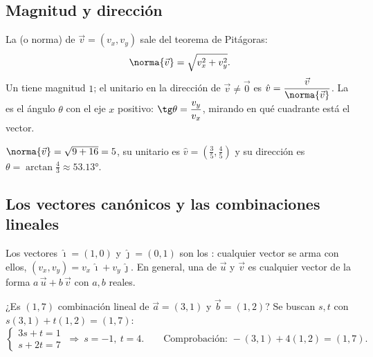 \documentclass[11pt,a4paper]{article}
\newcommand{\ii}{\hat{\imath}}
\newcommand{\jj}{\hat{\jmath}}
\newcommand{\plano}[4]{\draw[rejilla] (#1,#3) grid (#2,#4);
  \draw[ejes] (#1-0.3,0) -- (#2+0.4,0) node[right,font=\footnotesize] {$x$};
  \draw[ejes] (0,#3-0.3) -- (0,#4+0.4) node[above,font=\footnotesize] {$y$};}
\begin{document}
\subsection{Magnitud y dirección}
\begin{minipage}[c]{0.6\linewidth}
\begin{definicion}
La  (o norma) de $\vec v=(v_x,v_y)$ sale del teorema de Pitágoras:
\[ \norma{\vec v}=\sqrt{v_x^{2}+v_y^{2}}. \]
Un  tiene magnitud $1$; el unitario en la dirección de $\vec v\neq\vec0$ es
$\hat v=\dfrac{\vec v}{\norma{\vec v}}$. La  es el ángulo $\theta$ con el eje $x$ positivo:
$\tg\theta=\dfrac{v_y}{v_x}$, mirando en qué cuadrante está el vector.
\end{definicion}
\end{minipage}\hfill
\begin{minipage}[c]{0.36\linewidth}\centering
{}
\end{minipage}
\begin{ejemplo}[El vector del video: $\vec v=(3,4)$]
$\norma{\vec v}=\sqrt{9+16}=5$, su unitario es $\hat v=\left(\tfrac35,\tfrac45\right)$ y su dirección es
$\theta=\arctan\tfrac43\approx\ang{53.13}$.
\end{ejemplo}

\subsection{Los vectores canónicos y las combinaciones lineales}
Los vectores $\ii=(1,0)$ y $\jj=(0,1)$ son los : cualquier vector se arma con ellos,
$(v_x,v_y)=v_x\,\ii+v_y\,\jj$. En general, una  de $\vec u$ y $\vec v$ es cualquier vector
de la forma $a\,\vec u+b\,\vec v$ con $a,b$ reales.
\begin{ejemplo}
¿Es $(1,7)$ combinación lineal de $\vec a=(3,1)$ y $\vec b=(1,2)$? Se buscan $s,t$ con $s(3,1)+t(1,2)=(1,7)$:
\[ \begin{cases}3s+t=1\\ s+2t=7\end{cases}\ \Rightarrow\ s=-1,\ t=4. \qquad\text{Comprobación: } -(3,1)+4(1,2)=(1,7). \]
\end{ejemplo}
\end{document}
